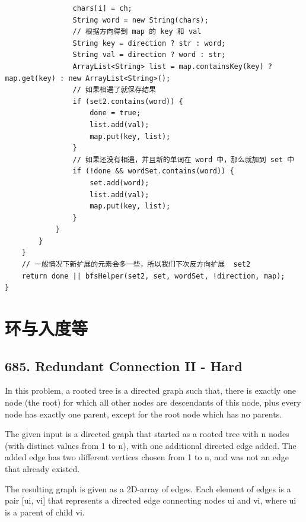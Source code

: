\documentclass[9pt, b5paaper]{book}
\begin{document}
\begin{enumerate}
\begin{verbatim}
                chars[i] = ch;
                String word = new String(chars);
                // 根据方向得到 map 的 key 和 val
                String key = direction ? str : word;
                String val = direction ? word : str;
                ArrayList<String> list = map.containsKey(key) ? map.get(key) : new ArrayList<String>();
                // 如果相遇了就保存结果
                if (set2.contains(word)) {
                    done = true;
                    list.add(val);
                    map.put(key, list);
                }
                // 如果还没有相遇，并且新的单词在 word 中，那么就加到 set 中
                if (!done && wordSet.contains(word)) {
                    set.add(word);
                    list.add(val);
                    map.put(key, list);
                }
            }
        }
    }
    // 一般情况下新扩展的元素会多一些，所以我们下次反方向扩展  set2
    return done || bfsHelper(set2, set, wordSet, !direction, map);
}
\end{verbatim}
\end{enumerate}

\section{环与入度等}
\label{sec-1-7}
\subsection{685. Redundant Connection II - Hard}
\label{sec-1-7-1}
In this problem, a rooted tree is a directed graph such that, there is exactly one node (the root) for which all other nodes are descendants of this node, plus every node has exactly one parent, except for the root node which has no parents.

The given input is a directed graph that started as a rooted tree with n nodes (with distinct values from 1 to n), with one additional directed edge added. The added edge has two different vertices chosen from 1 to n, and was not an edge that already existed.

The resulting graph is given as a 2D-array of edges. Each element of edges is a pair [ui, vi] that represents a directed edge connecting nodes ui and vi, where ui is a parent of child vi.
\end{document}
